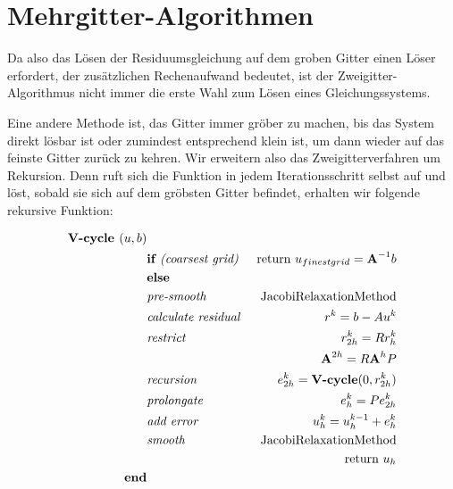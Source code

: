 \section{Mehrgitter-Algorithmen}\label{s.Mehrgitteralgorithmus}

Da also das Lösen der Residuumsgleichung auf dem groben Gitter einen Löser erfordert, der zusätzlichen Rechenaufwand bedeutet, ist der Zweigitter-Algorithmus nicht immer die erste Wahl zum Lösen eines Gleichungssystems.

Eine andere Methode ist, das Gitter immer gröber zu machen, bis das System direkt lösbar ist oder zumindest entsprechend klein ist, um dann wieder auf das feinste Gitter zurück zu kehren. Wir erweitern also das Zweigitterverfahren um Rekursion. Denn ruft sich die Funktion in jedem Iterationsschritt selbst auf und löst, sobald sie sich auf dem gröbsten Gitter befindet, erhalten wir folgende rekursive Funktion:

\begin{eqnarray}
\textbf{V-cycle }(u,b)                         & \notag \\
&\textbf{if }\textit{(coarsest grid) }&\textnormal{return } u_{finest grid}={\textbf{A}}^{-1}b \notag \\
&\textbf{else }                                                & \notag \\
&\textit{pre-smooth }                                 &\textnormal{JacobiRelaxationMethod} \notag \\
&\textit{calculate residual }                &r^{k} = b - Au^{k} \notag \\
&\textit{restrict }                                 &r^{k}_{2h}=Rr^{k}_{h} \notag \\
&                                                                        &{\textbf{A}}^{2h} = R{\textbf{A}}^{h}P \notag \\
&\textit{recursion }                                &e^{k}_{2h} = \textbf{V-cycle}(0,r^{k}_{2h}) \notag \\
&\textit{prolongate }                                &e^{k}_{h} = Pe^{k}_{2h} \notag \\
&\textit{add error }                                &u^{k}_{h} = u^{k-1}_{h} + e^{k}_{h} \notag \\
&\textit{smooth }                                        &\textnormal{JacobiRelaxationMethod} \notag \\
&                                                                        &\textnormal{return } u_{h} \notag \\
\textbf{end}                                                & \notag
\end{eqnarray}

